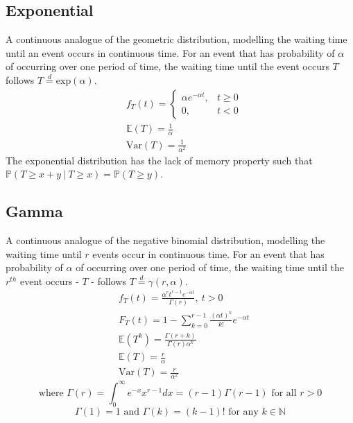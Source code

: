 \documentclass[titlepage,twocolumn]{article}
\begin{document}
\subsection*{Exponential}
A continuous analogue of the geometric distribution, modelling the waiting time until an event occurs in continuous time. For an event that has probability of $\alpha$ of occurring over one period of time, the waiting time until the event occurs $T$ follows $T\stackrel{d}{=}\mbox{exp}(\alpha)$.
\begin{align*}
    &f_T(t)=\begin{cases} \alpha e^{-\alpha t}, & t \geq 0 \\ 0, & t < 0 \end{cases}\\
    &\mathbb{E}(T)=\frac{1}{\alpha}\\
    &\mbox{Var}(T)=\frac{1}{\alpha ^2}
\end{align*}
The exponential distribution has the lack of memory property such that $\mathbb{P}(T \geq x+y\ |\ T \geq x) = \mathbb{P}(T \geq y)$.
\vfill
\subsection*{Gamma}
A continuous analogue of the negative binomial distribution, modelling the waiting time until $r$ events occur in continuous time. For an event that has probability of $\alpha$ of occurring over one period of time, the waiting time until the $r^{th}$ event occurs - $T$ - follows $T\stackrel{d}{=} \gamma(r, \alpha)$.
\begin{align*}
    &f_T(t)=\frac{\alpha^r t^{r-1} e^{-\alpha t}}{\Gamma(r)},\ t > 0\\
    &F_T(t)=1-\sum_{k=0}^{r-1}\frac{(\alpha t)^k}{k!}e^{-\alpha t}\\
    &\mathbb{E}(T^k)=\frac{\Gamma(r+k)}{\Gamma(r)\alpha^k}\\
    &\mathbb{E}(T)=\frac{r}{\alpha}\\
    &\mbox{Var}(T)=\frac{r}{\alpha ^2}
\end{align*}
$$\mbox{where }\Gamma(r) = \int_0^\infty e^{-x}x^{r-1} dx = (r-1)\Gamma(r-1) \mbox{ for all } r > 0$$
$$\Gamma(1) = 1 \mbox{ and } \Gamma(k) = (k-1)! \mbox{ for any } k \in \mathbb{N}$$
\end{document}
